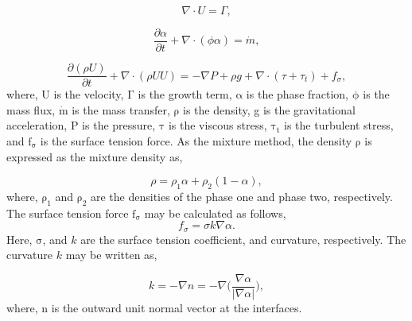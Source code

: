 \begin{equation}
    \label{eq:continuity}
    \nabla \cdot U = \Gamma,
\end{equation}

\begin{equation}
    \label{eq:mass}
    \frac{\partial \alpha}{\partial t} + \nabla\cdot (\phi \alpha) = \Dot{m},
\end{equation}

\begin{equation}
    \label{eq:momentum}
    \frac{\partial (\rho U)}{\partial t} + \nabla\cdot (\rho U U) = -\nabla P + \rho g+\nabla \cdot (\tau+\tau_t)+f_{\sigma},
\end{equation}
where, U is the velocity, $\mathrm{\Gamma}$ is the growth term, $\mathrm{\alpha}$ is the phase fraction, $\mathrm{\phi}$ is the mass flux, $\mathrm{\Dot{m}}$ is the mass transfer, $\mathrm{\rho}$ is the density, g is the gravitational acceleration, P is the pressure, $\mathrm{\tau}$ is the viscous stress, $\mathrm{\tau_t}$ is the turbulent stress, and $\mathrm{f_{\sigma}}$ is the surface tension force. As the mixture method, the density $\mathrm{\rho}$ is expressed as the mixture density as,  

\begin{equation}
    \label{eq:mixtureDensity}
    \rho = \rho_1 \alpha + \rho_2 (1-\alpha),
\end{equation}
where, $\mathrm{\rho_1}$ and $\mathrm{\rho_2}$ are the densities of the phase one and phase two, respectively. The surface tension force $\mathrm{f_{\sigma}}$ may be calculated as follows,
\begin{equation}
    \label{eq:surfaceTension}
    f_{\sigma} = \sigma k \nabla\alpha.
\end{equation}
Here, $\mathrm{\sigma}$, and $k$ are the surface tension coefficient, and curvature, respectively. The curvature $k$ may be written as, 

\begin{equation}
    \label{eq:curvature}
    k = -\nabla n = -\nabla \Bigg(\frac{\nabla \alpha}{\big| \nabla \alpha\big|} \Bigg),
\end{equation}
where, n is the outward unit normal vector at the interfaces.

